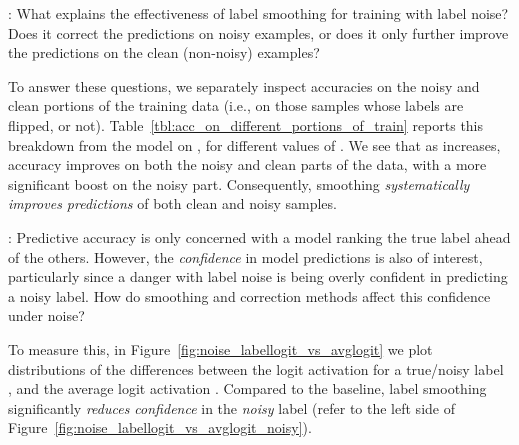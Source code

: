 \begin{figure*}[!t]
    \centering
    \qquad
    \caption{Density of differences between logit corresponding to the 
    true (left plot; corresponding to the ``true'' label, before injecting label noise) and 
    noisy label (right plot; corresponding to the ``noisy'' label, after injecting label noise) 
    and the average over all logits on the mis-labeled portion of the train data.
    Results are with  on \cifarH{}, and the \resnetT{} model.
    LS reduces confidence mostly on the noisy label, whereas FC and BC increase confidence mostly on the true label.
    See Figure~\ref{fig:maxlogit_vs_avglogit} for plots on full and clean data.}
    \label{fig:noise_labellogit_vs_avglogit}
\end{figure*}

:
What explains the effectiveness of label smoothing for training with label noise? 
{Does it 
correct the predictions on noisy examples,
or does it 
only further improve the predictions 
on the clean (non-noisy) examples?}


To answer these questions, we separately inspect accuracies on the noisy and clean portions of the training data (i.e., on those samples whose labels are flipped, or not).
Table~\ref{tbl:acc_on_different_portions_of_train} reports this breakdown from the \resnetT{} model on \cifarH{}, for different values of . 
We see that as  increases, accuracy improves on both the noisy and clean parts of the data, 
with a more significant boost on the noisy part.
Consequently, smoothing \emph{systematically improves predictions} of both clean and noisy samples.


:
Predictive accuracy is only concerned with a model ranking the true label ahead of the others.
However, the \emph{confidence} in model predictions is also of interest,
particularly since a danger with label noise is 
being overly confident in predicting a noisy label.
How do smoothing and correction methods affect this confidence under noise?

To measure this,
in Figure~\ref{fig:noise_labellogit_vs_avglogit} 
we plot distributions of the differences between the logit activation  for a true/noisy label , 
and the average logit activation . 
Compared to the baseline, label smoothing significantly \emph{reduces confidence} in the \emph{noisy} label 
(refer to the left side of Figure~\ref{fig:noise_labellogit_vs_avglogit_noisy}).

